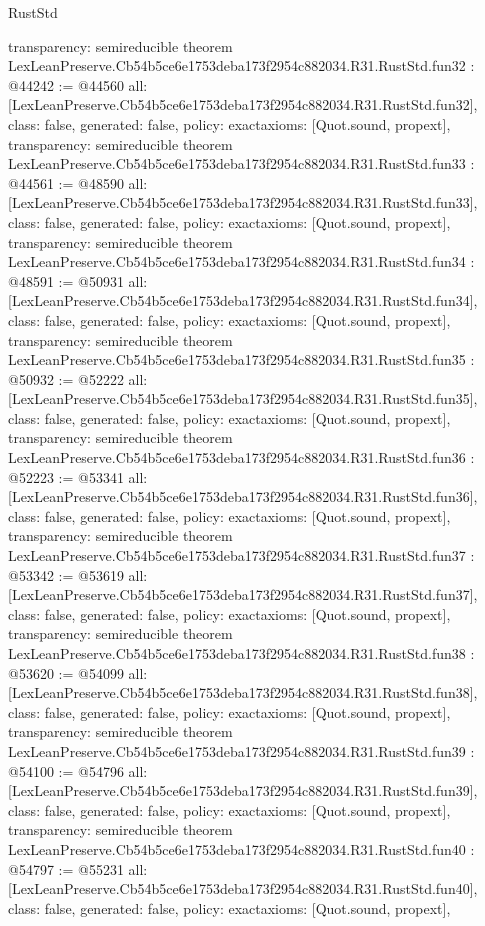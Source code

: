 \begin{lexlean}{RustStd}
\begin{coremodule}
{  transparency: semireducible
}
theorem LexLeanPreserve.Cb54b5ce6e1753deba173f2954c882034.R31.RustStd.fun32 : @44242 := @44560 {
  all: [LexLeanPreserve.Cb54b5ce6e1753deba173f2954c882034.R31.RustStd.fun32],
  class: false,
  generated: false,
  policy: exact{axioms: [Quot.sound, propext]},
  transparency: semireducible
}
theorem LexLeanPreserve.Cb54b5ce6e1753deba173f2954c882034.R31.RustStd.fun33 : @44561 := @48590 {
  all: [LexLeanPreserve.Cb54b5ce6e1753deba173f2954c882034.R31.RustStd.fun33],
  class: false,
  generated: false,
  policy: exact{axioms: [Quot.sound, propext]},
  transparency: semireducible
}
theorem LexLeanPreserve.Cb54b5ce6e1753deba173f2954c882034.R31.RustStd.fun34 : @48591 := @50931 {
  all: [LexLeanPreserve.Cb54b5ce6e1753deba173f2954c882034.R31.RustStd.fun34],
  class: false,
  generated: false,
  policy: exact{axioms: [Quot.sound, propext]},
  transparency: semireducible
}
theorem LexLeanPreserve.Cb54b5ce6e1753deba173f2954c882034.R31.RustStd.fun35 : @50932 := @52222 {
  all: [LexLeanPreserve.Cb54b5ce6e1753deba173f2954c882034.R31.RustStd.fun35],
  class: false,
  generated: false,
  policy: exact{axioms: [Quot.sound, propext]},
  transparency: semireducible
}
theorem LexLeanPreserve.Cb54b5ce6e1753deba173f2954c882034.R31.RustStd.fun36 : @52223 := @53341 {
  all: [LexLeanPreserve.Cb54b5ce6e1753deba173f2954c882034.R31.RustStd.fun36],
  class: false,
  generated: false,
  policy: exact{axioms: [Quot.sound, propext]},
  transparency: semireducible
}
theorem LexLeanPreserve.Cb54b5ce6e1753deba173f2954c882034.R31.RustStd.fun37 : @53342 := @53619 {
  all: [LexLeanPreserve.Cb54b5ce6e1753deba173f2954c882034.R31.RustStd.fun37],
  class: false,
  generated: false,
  policy: exact{axioms: [Quot.sound, propext]},
  transparency: semireducible
}
theorem LexLeanPreserve.Cb54b5ce6e1753deba173f2954c882034.R31.RustStd.fun38 : @53620 := @54099 {
  all: [LexLeanPreserve.Cb54b5ce6e1753deba173f2954c882034.R31.RustStd.fun38],
  class: false,
  generated: false,
  policy: exact{axioms: [Quot.sound, propext]},
  transparency: semireducible
}
theorem LexLeanPreserve.Cb54b5ce6e1753deba173f2954c882034.R31.RustStd.fun39 : @54100 := @54796 {
  all: [LexLeanPreserve.Cb54b5ce6e1753deba173f2954c882034.R31.RustStd.fun39],
  class: false,
  generated: false,
  policy: exact{axioms: [Quot.sound, propext]},
  transparency: semireducible
}
theorem LexLeanPreserve.Cb54b5ce6e1753deba173f2954c882034.R31.RustStd.fun40 : @54797 := @55231 {
  all: [LexLeanPreserve.Cb54b5ce6e1753deba173f2954c882034.R31.RustStd.fun40],
  class: false,
  generated: false,
  policy: exact{axioms: [Quot.sound, propext]},
}
\end{coremodule}
\end{lexlean}
